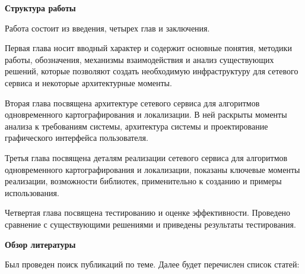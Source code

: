 \documentclass[a4paper, 14pt]{extreport}
\begin{document}
\vspace{2mm}
\par\noindent\textbf{Структура работы}
\vspace{2mm}
\par Работа состоит из введения, четырех глав и заключения.
\par Первая глава носит вводный характер и содержит основные понятия, методики работы, обозначения, механизмы взаимодействия и анализ 
существующих решений, которые позволяют создать необходимую инфраструктуру для сетевого сервиса и некоторые архитектурные моменты.
\par Вторая глава посвящена архитектуре сетевого сервиса для алгоритмов одновременного картографирования и локализации. В ней раскрыты
моменты анализа к требованиям системы, архитектура системы и проектирование графического интерфейса пользователя.
\par Третья глава посвящена деталям реализации сетевого сервиса для алгоритмов одновременного картографирования и локализации, показаны
ключевые моменты реализации, возможности библиотек, применительно к созданию и примеры использования.
\par Четвертая глава посвящена тестированию и оценке эффективности. Проведено сравнение с существующими решениями и приведены результаты
тестирования.
\vspace{2mm}
\par\noindent\textbf{Обзор литературы}
\vspace{2mm}
\par Был проведен поиск публикаций по теме. Далее будет перечислен список статей:
\end{document}
